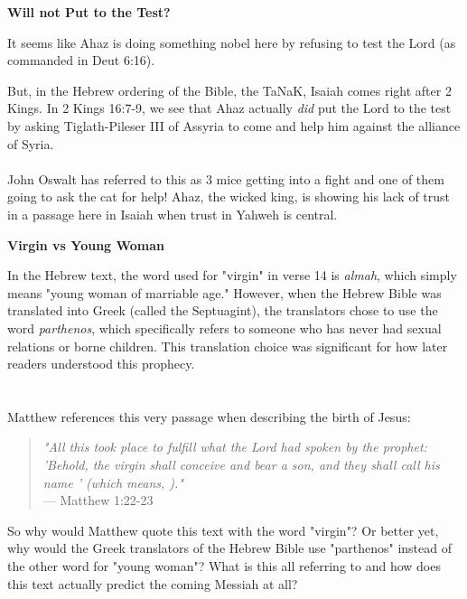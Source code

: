 \documentclass[11pt]{article}
\begin{document}
\newpage
{\large\bfseries Will not Put to the Test?}
\vspace{1em}

It seems like Ahaz is doing something nobel here by refusing to test the Lord (as commanded in Deut 6:16).

But, in the Hebrew ordering of the Bible, the TaNaK, Isaiah comes right after 2 Kings. In 2 Kings 16:7-9, we see that Ahaz actually \textit{did} put the Lord to the test by asking Tiglath-Pileser III of Assyria to come and help him against the alliance of Syria.
\\\\
John Oswalt has referred to this as 3 mice getting into a fight and one of them going to ask the cat for help! Ahaz, the wicked king, is showing his lack of trust in a passage here in Isaiah when trust in Yahweh is central.


\vspace{2em}
{\large\bfseries Virgin vs Young Woman}


In the Hebrew text, the word used for "virgin" in verse 14 is \textit{almah}, which simply means "young woman of marriable age." However, when the Hebrew Bible was translated into Greek (called the Septuagint), the translators chose to use the word \textit{parthenos}, which specifically refers to someone who has never had sexual relations or borne children. This translation choice was significant for how later readers understood this prophecy.
\\\\\\
Matthew references this very passage when describing the birth of Jesus:
\\
\begin{quote}
\textit{"All this took place to fulfill what the Lord had spoken by the prophet: 'Behold, the virgin shall conceive and bear a son, and they shall call his name ' (which means, )."} \\
\hfill --- Matthew 1:22-23
\end{quote}
{\vspace{1em}}
So why would Matthew quote this text with the word "virgin"? Or better yet, why would the Greek translators of the Hebrew Bible use "parthenos" instead of the other word for "young woman"? What is this all referring to and how does this text actually predict the coming Messiah at all?
\end{document}
